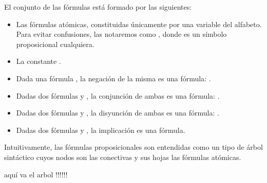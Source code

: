 \begin{isabellebody}
\begin{isamarkuptext}
  \begin{definicion}
    El conjunto de las fórmulas está formado por las siguientes:
    \begin{itemize}
      \item Las fórmulas atómicas, constituidas únicamente por una variable del alfabeto. Para 
      evitar confusiones, las notaremos como , donde  es un símbolo proposicional
      cualquiera.
      \item La constante \isa{{\isasymbottom}}.
      \item Dada una fórmula , la negación de la misma es una fórmula: .
      \item Dadas dos fórmulas  y , la conjunción de ambas es una fórmula: .
      \item Dadas dos fórmulas  y , la disyunción de ambas es una fórmula: .
      \item Dadas dos fórmulas  y , la implicación  es una fórmula.
    \end{itemize}
  \end{definicion}

 Intuitivamente, las fórmulas proposicionales son entendidas como un tipo de árbol sintáctico 
  cuyos nodos son las conectivas y sus hojas las fórmulas atómicas.

        aquí va el arbol !!!!!!


\end{isamarkuptext}
\end{isabellebody}
